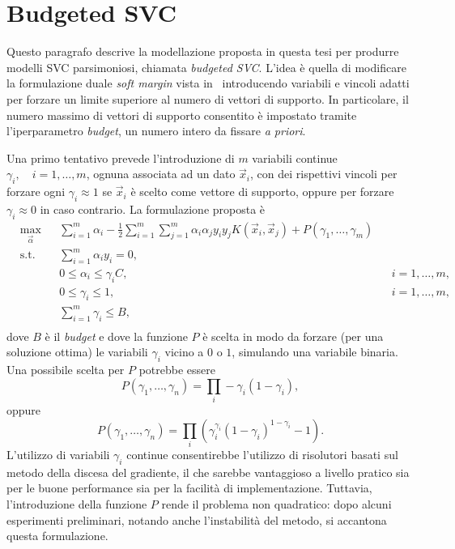 \section{Budgeted SVC}\label{sec:our_budgeted_svm}
Questo paragrafo descrive la modellazione proposta in questa tesi per produrre modelli SVC parsimoniosi, chiamata \emph{budgeted SVC}.
L'idea è quella di modificare la formulazione duale \emph{soft margin} vista in~ introducendo variabili e vincoli adatti per forzare un limite superiore al numero di vettori di supporto.
In particolare, il numero massimo di vettori di supporto consentito è impostato tramite l'iperparametro \emph{budget}, un numero intero da fissare \emph{a priori}.

Una primo tentativo prevede l'introduzione di $m$ variabili continue $\gamma_i,\quad i=1,\dots,m$, ognuna associata ad un dato $\Vec{x}_i$, con dei rispettivi vincoli per forzare ogni $\gamma_i\approx1$ se $\Vec{x}_i$ è scelto come vettore di supporto, oppure per forzare $\gamma_i\approx0$ in caso contrario.
La formulazione proposta è 
\begin{equation}\label{eq:budget_svc:continuous_gamma_formulation}
\begin{aligned}
& \max_{\Vec{\alpha}}    && \sum_{i=1}^{m}\alpha_i - \frac{1}{2}\sum_{i=1}^{m}\sum_{j=1}^{m}\alpha_i\alpha_jy_iy_jK(\Vec{x}_i, \Vec{x}_j) +P(\gamma_1, \dots, \gamma_m)\\
& \textrm{s.t.} && \sum_{i=1}^{m} \alpha_iy_i = 0,                   \\
&               && 0 \leq \alpha_i \leq \gamma_iC,   && i=1,\dots,m,  \\
&               && 0 \leq \gamma_i \leq 1,           && i=1, \dots,m,\\
&               && \sum_{i=1}^{m} \gamma_i \leq B,                   \\
\end{aligned}
\end{equation}
dove $B$ è il \emph{budget} e dove la funzione $P$ è scelta in modo da forzare (per una soluzione ottima) le variabili $\gamma_i$ vicino a $0$ o $1$, simulando una variabile binaria.
Una possibile scelta per $P$ potrebbe essere 
$$P(\gamma_1, \dots, \gamma_n) = \prod_i -\gamma_i (1 - \gamma_i),$$
oppure 
$$P(\gamma_1, \dots, \gamma_n) = \prod_i \left( \gamma_i^{\gamma_i} (1 - \gamma_i)^{1 - \gamma_i} - 1 \right).$$
%
%
L'utilizzo di variabili $\gamma_i$ continue consentirebbe l'utilizzo di risolutori basati sul metodo della discesa del gradiente, il che sarebbe vantaggioso a livello pratico sia per le buone performance sia per la facilità di implementazione. 
Tuttavia, l'introduzione della funzione $P$ rende il problema non quadratico: dopo alcuni esperimenti preliminari, notando anche l'instabilità del metodo, si accantona questa formulazione.

